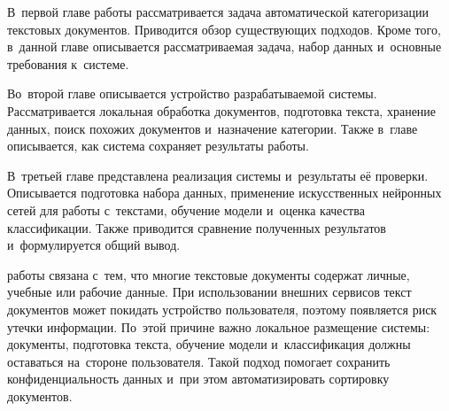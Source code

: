В~первой главе работы рассматривается задача автоматической категоризации
текстовых документов. Приводится обзор существующих подходов. Кроме того, в~данной
главе описывается рассматриваемая задача, набор данных и~основные требования
к~системе.

Во~второй главе описывается устройство разрабатываемой системы. Рассматривается
локальная обработка документов, подготовка текста, хранение данных, поиск
похожих документов и~назначение категории. Также в~главе описывается, как
система сохраняет результаты работы.

В~третьей главе представлена реализация системы и~результаты её проверки.
Описывается подготовка набора данных, применение искусственных нейронных сетей
для работы с~текстами, обучение модели и~оценка качества классификации. Также
приводится сравнение полученных результатов и~формулируется общий вывод.

{\actuality} работы связана с~тем, что многие текстовые документы содержат
личные, учебные или рабочие данные. При использовании внешних сервисов текст
документов может покидать устройство пользователя, поэтому появляется риск
утечки информации. По~этой причине важно локальное размещение системы:
документы, подготовка текста, обучение модели и~классификация должны оставаться
на~стороне пользователя. Такой подход помогает сохранить конфиденциальность
данных и~при этом автоматизировать сортировку документов.
